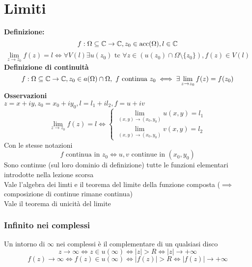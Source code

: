 \section{Limiti}
\textbf{Definizione: } \[f:\Omega\subseteq\mathbb{C}\to \mathbb{C}, z_0\in \text{acc}(\Omega),l\in\mathbb{C}\]
\[\lim_{z \to z_0} f(z)=l\iff\forall V(l)\exists
u(z_0) \text{ tc }\forall z\in (u(z_0) \cap \Omega\setminus\{z_0\}), f(z)\in V(l)\]
\textbf{Definizione di continuità}
\[f:\Omega\subseteq\mathbb{C}\to \mathbb{C}, z_0\in a(\Omega)\cap \Omega,\  f \text{ continua } z_0 \iff\exists \lim_{z \to z_0} f(z)=f(z_0)\]
\textbf{Osservazioni}
\\$z=x+iy, z_0=x_0+iy_0, l=l_1+il_2, f=u+iv$
\[\lim_{z \to z_0} f(z)=l\iff 
\begin{cases}	
	\lim_{(x,y) \to (x_0,y_0)} u(x,y)=l_1\\ 
	\lim_{(x,y) \to (x_0,y_0)} v(x,y)=l_2
\end{cases}
\]
Con le stesse notazioni
\[f \text{ continua in }z_0\iff u,v \text{ continue in } (x_0,y_0)\]
Sono continue (sul loro dominio di definizione) tutte le funzioni elementari introdotte nella lezione scorsa
\\Vale l'algebra dei limti e il teorema del limite della funzione composta ($\implies$ composizione di continue rimane continua)
\\Vale il teorema di unicità del limite
\subsubsection{Infinito nei complessi}
Un intorno di $\infty$ nei complessi è il complementare di un qualsiasi disco
\[z\to \infty \iff z\in u(\infty)\iff |z|>R\iff |z|\to +\infty\]
\[f(z)\to \infty \iff f(z)\in u(\infty) \iff |f(z)|>R \iff |f(z)|\to +\infty\]

